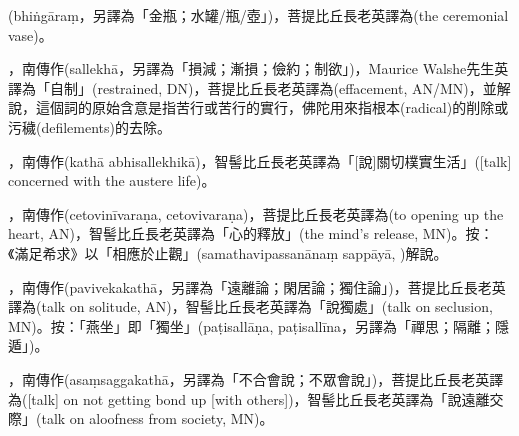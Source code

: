 \startitemgroup[noteitems]
\item{}(bhiṅgāraṃ，另譯為「金瓶；水罐/瓶/壺」)，菩提比丘長老英譯為(the ceremonial vase)。
\stopitemgroup

\startitemgroup[noteitems]
\item{}，南傳作(sallekhā，另譯為「損減；漸損；儉約；制欲」)，Maurice Walshe先生英譯為「自制」(restrained, DN)，菩提比丘長老英譯為(effacement, AN/MN)，並解說，這個詞的原始含意是指苦行或苦行的實行，佛陀用來指根本(radical)的削除或污穢(defilements)的去除。
\item{}，南傳作(kathā abhisallekhikā)，智髻比丘長老英譯為「[說]關切樸實生活」([talk] concerned with the austere life)。
\stopitemgroup

\startitemgroup[noteitems]
\item{}，南傳作(cetovinīvaraṇa, cetovivaraṇa)，菩提比丘長老英譯為(to opening up the heart, AN)，智髻比丘長老英譯為「心的釋放」(the mind's release, MN)。按：《滿足希求》以「相應於止觀」(samathavipassanānaṃ sappāyā, )解說。
\stopitemgroup

\startitemgroup[noteitems]
\item{}，南傳作(pavivekakathā，另譯為「遠離論；閑居論；獨住論」)，菩提比丘長老英譯為(talk on solitude, AN)，智髻比丘長老英譯為「說獨處」(talk on seclusion, MN)。按：「燕坐」即「獨坐」(paṭisallāṇa, paṭisallīna，另譯為「禪思；隔離；隱遁」)。
\stopitemgroup

\startitemgroup[noteitems]
\item{}，南傳作(asaṃsaggakathā，另譯為「不合會說；不眾會說」)，菩提比丘長老英譯為([talk] on not getting bond up [with others])，智髻比丘長老英譯為「說遠離交際」(talk on aloofness from society, MN)。
\stopitemgroup


